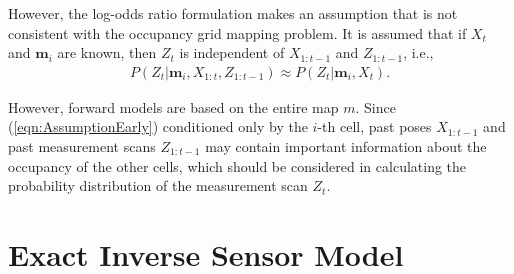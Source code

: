 \documentclass[letterpaper, 10pt, conference]{ieeeconf}
\newcommand{\refeqn}[1]{(\ref{eqn:#1})}
\begin{document}
However, the log-odds ratio formulation makes an assumption that is not consistent with the occupancy grid mapping problem. It is assumed that if $X_t$ and $\mathbf{m}_i$ are known, then $Z_t$ is independent of $X_{1:t-1}$ and $Z_{1:t-1}$, i.e.,
\begin{align}
\label{eqn:AssumptionEarly}
P(Z_t|\mathbf{m}_i,X_{1:t},Z_{1:t-1})\approx P(Z_t|\mathbf{m}_i,X_t).
\end{align}


However, forward models are based on the entire map $m$. Since \refeqn{AssumptionEarly} conditioned only by the $i$-th cell, past poses $X_{1:t-1}$ and past measurement scans $Z_{1:t-1}$ may contain important information about the occupancy of the other cells, which should be considered in calculating the probability distribution of the measurement scan $Z_t$.  %




	
	
\section{Exact Inverse Sensor Model}
\label{sec:ISM}
\end{document}
